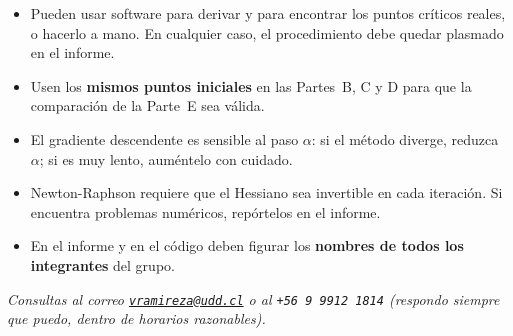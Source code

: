 \documentclass[12pt,a4paper]{article}
\begin{document}
\begin{itemize}[topsep=2pt]
    \item Pueden usar software para derivar y para encontrar los puntos
          críticos reales, o hacerlo a mano. En cualquier caso, el
          procedimiento debe quedar plasmado en el informe.
    \item Usen los \textbf{mismos puntos iniciales} en las Partes~B, C y D para
          que la comparación de la Parte~E sea válida.
    \item El gradiente descendente es sensible al paso $\alpha$: si el método
          diverge, reduzca $\alpha$; si es muy lento, auméntelo con cuidado.
    \item Newton-Raphson requiere que el Hessiano sea invertible en cada
          iteración. Si encuentra problemas numéricos, repórtelos en el
          informe.
    \item En el informe y en el código deben figurar los \textbf{nombres de
          todos los integrantes} del grupo.
\end{itemize}

\vspace{1em}
\begin{center}
\textit{Consultas al correo
\href{mailto:vramireza@udd.cl}{\texttt{vramireza@udd.cl}} o al
\texttt{+56\,9\,9912\,1814}
(respondo siempre que puedo, dentro de horarios razonables).}
\end{center}

\end{document}

